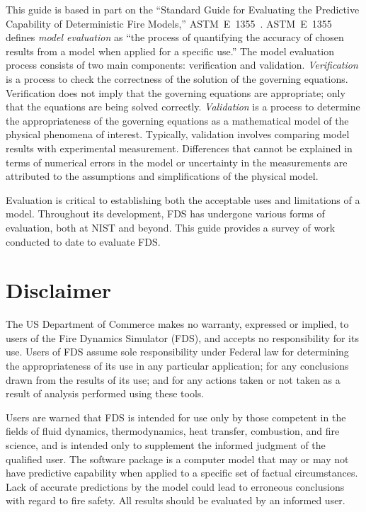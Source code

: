 \documentclass[11pt]{book}
\begin{document}
This guide is based in part on the ``Standard Guide for
Evaluating the Predictive Capability of Deterministic Fire Models,'' ASTM~E~1355~\cite{ASTM:E1355}.
ASTM~E~1355 defines {\em model evaluation} as ``the process of quantifying
the accuracy of chosen results from a model when applied for a specific use.''
The model evaluation process consists of two main components: verification and validation.
{\em Verification} is a process to check the correctness of the solution of the
governing equations. Verification does not imply that the governing equations are
appropriate; only that the equations are being solved correctly.
{\em Validation} is a process to determine the appropriateness of the governing equations as a mathematical
model of the physical phenomena of interest. Typically, validation involves comparing
model results with experimental measurement. Differences that cannot be explained in terms of
numerical errors in the model or uncertainty in the measurements
are attributed to the assumptions and simplifications of the physical model.

Evaluation is critical to establishing both the acceptable uses
and limitations of a model. Throughout its development, FDS has undergone various forms of evaluation,
both at NIST and beyond. This guide provides a survey of work conducted to date to evaluate FDS.



\chapter{Disclaimer}

The US Department of Commerce makes no warranty, expressed or implied,
to users of the Fire Dynamics Simulator (FDS), and accepts no responsibility for its use.
Users of FDS assume sole responsibility under Federal law for determining
the appropriateness of its use in any particular application;
for any conclusions drawn from the results of its use; and for any
actions taken or not taken as a result of analysis performed using
these tools.

Users are warned that FDS is intended for use only by those competent
in the fields of fluid dynamics, thermodynamics, heat transfer,
combustion, and fire science, and is intended only to supplement the
informed judgment of the qualified user. The software package is a
computer model that may or may not have predictive capability when
applied to a specific set of factual circumstances. Lack of accurate
predictions by the model could lead to erroneous conclusions with
regard to fire safety. All results should be evaluated by an informed
user.
\end{document}
